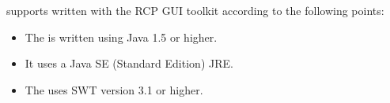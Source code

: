 \app{} supports \gdauts{} written with the RCP GUI toolkit according to the following points:


\begin{itemize}
\item The \gdaut{} is written using Java 1.5 or higher. 
\item It uses a Java SE (Standard Edition) JRE.
\item The \gdaut{} uses SWT version 3.1 or higher. 
\end{itemize}
